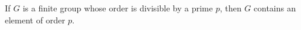 If $G$ is a finite group whose order is divisible by a prime $p$, then $G$ contains an element of order $p$.
